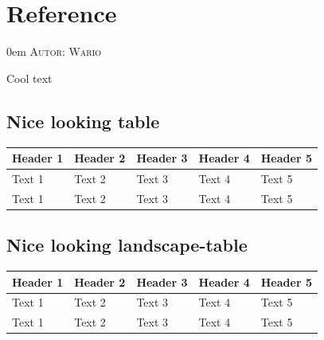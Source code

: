 \documentclass{article}
\makeatletter
\newcommand{\sectionauthor}[1]{
	{\parindent 0em \large \scshape Autor: #1 \par \nobreak \vspace*{1em}}
	\@afterheading
}
\makeatother
\begin{document}
\section{Reference}
\sectionauthor{Wario}
Cool text

\subsection{Nice looking table}
\begin{longtable}{@{}lllll@{}}
\toprule
\textbf{Header 1} & \textbf{Header 2} & \textbf{Header 3} & \textbf{Header 4} & \textbf{Header 5} \\* \midrule
\endfirsthead
%
\endhead
%
Text 1            & Text 2            & Text 3            & Text 4            & Text 5            \\
Text 1            & Text 2            & Text 3            & Text 4            & Text 5            \\* \bottomrule
\end{longtable}

\subsection{Nice looking landscape-table}
\begin{landscape}
\begin{longtable}{@{}lllll@{}}
\toprule
\textbf{Header 1} & \textbf{Header 2} & \textbf{Header 3} & \textbf{Header 4} & \textbf{Header 5} \\* \midrule
\endfirsthead
%
\endhead
%
Text 1            & Text 2            & Text 3            & Text 4            & Text 5            \\
Text 1            & Text 2            & Text 3            & Text 4            & Text 5            \\* \bottomrule
\end{longtable}
\end{landscape}
\end{document}
